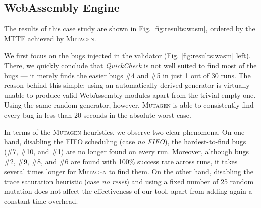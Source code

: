 \documentclass[sigconf, anonymous, review]{acmart}
\newcommand{\quickcheck}{\textit{QuickCheck}\xspace}
\newcommand{\mutagen}{\textsc{Mutagen}\xspace}
\begin{document}
\subsection{WebAssembly Engine}

The results of this case study are shown in Fig. \ref{fig:results:wasm}, ordered
by the MTTF achieved by \mutagen.

We first focus on the bugs injected in the validator (Fig.
\ref{fig:results:wasm} left).
%
There, we quickly conclude that \quickcheck is not well suited to find most of
the bugs --- it merely finds the easier bugs \#4 and \#5 in just 1 out of 30
runs.
%
The reason behind this simple:
%
%
using an automatically derived generator is virtually unable to produce valid
WebAssembly modules apart from the trivial empty one.
%
Using the same random generator, however, \mutagen is able to consistently find
every bug in less than 20 seconds in the absolute worst case.


In terms of the \mutagen heuristics, we observe two clear phenomena.
%
On one hand, disabling the FIFO scheduling (case \textit{no FIFO}), the
hardest-to-find bugs (\#7, \#10, and \#1) are no longer found on every run.
%
Moreover, although bugs \#2, \#9, \#8, and \#6 are found with 100\% success rate
across runs, it takes several times longer for \mutagen to find them.
%
On the other hand, disabling the trace saturation heuristic (case \textit{no
  reset}) and using a fixed number of 25 random mutation does not affect the
effectiveness of our tool, apart from adding again a constant time overhead.
\end{document}

